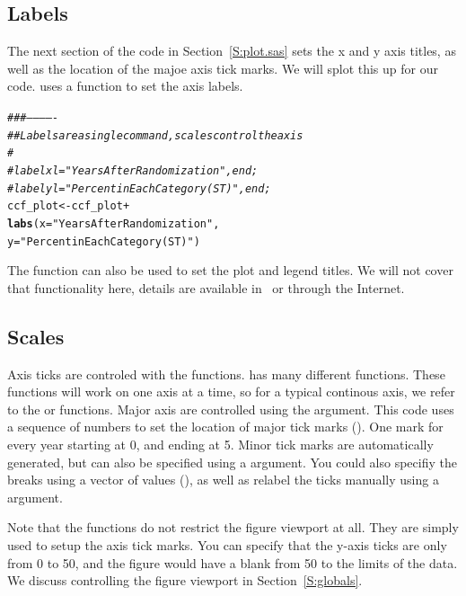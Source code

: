 \documentclass[nojss]{jss}\usepackage[]{graphicx}\usepackage[]{color}
\makeatletter
\newcommand{\hlstr}[1]{\textcolor[rgb]{0.192,0.494,0.8}{#1}}%
\newcommand{\hlcom}[1]{\textcolor[rgb]{0.678,0.584,0.686}{\textit{#1}}}%
\newcommand{\hlopt}[1]{\textcolor[rgb]{0,0,0}{#1}}%
\newcommand{\hlstd}[1]{\textcolor[rgb]{0.345,0.345,0.345}{#1}}%
\newcommand{\hlkwb}[1]{\textcolor[rgb]{0.69,0.353,0.396}{#1}}%
\newcommand{\hlkwc}[1]{\textcolor[rgb]{0.333,0.667,0.333}{#1}}%
\newcommand{\hlkwd}[1]{\textcolor[rgb]{0.737,0.353,0.396}{\textbf{#1}}}%
\newenvironment{kframe}{%
 \def\at@end@of@kframe{}%
 \ifinner\ifhmode%
  \def\at@end@of@kframe{\end{minipage}}%
  \begin{minipage}{\columnwidth}%
 \fi\fi%
 \def\FrameCommand##1{\hskip\@totalleftmargin \hskip-\fboxsep
 \colorbox{shadecolor}{##1}\hskip-\fboxsep
     \hskip-\linewidth \hskip-\@totalleftmargin \hskip\columnwidth}%
 \MakeFramed {\advance\hsize-\width
   \@totalleftmargin\z@ \linewidth\hsize
   \@setminipage}}%
 {\par\unskip\endMakeFramed%
 \at@end@of@kframe}
\newenvironment{knitrout}{}{} %
\makeatother
\begin{document}
\subsection{Labels}\label{S:labels}
The next section of the  code in Section~\ref{S:plot.sas} sets the x and y axis titles, as well as the location of the majoe axis tick marks. We will splot this up for our  code.   uses a  function to set the axis labels. 
\begin{knitrout}\footnotesize
{}\color{fgcolor}\begin{kframe}
\begin{alltt}
\hlcom{###-------------}
\hlcom{## Labels are a single command, scales control the axis}
\hlcom{#}
\hlcom{#    labelx l="Years After Randomization", end;}
\hlcom{#    labely l="Percent in Each Category (ST)", end;}
\hlstd{ccf_plot} \hlkwb{<-} \hlstd{ccf_plot} \hlopt{+}
  \hlkwd{labs}\hlstd{(}\hlkwc{x}\hlstd{=}\hlstr{"Years After Randomization"}\hlstd{,}
       \hlkwc{y}\hlstd{=}\hlstr{"Percent in Each Category (ST)"}\hlstd{)}
\end{alltt}
\end{kframe}
\end{knitrout}

The  function can also be used to set the plot  and legend titles. We will not cover that functionality here, details are available in~\cite{Wickham:2009} or through the Internet.

\subsection{Scales}\label{S:scales}
Axis ticks are controled with the  functions.  has many different  functions. These functions will work on one axis at a time, so for a typical continous axis, we refer to the  or  functions. Major axis are controlled using the  argument. This code uses a sequence of numbers to set the location of major tick marks (). One mark for every year starting at 0, and ending at 5. Minor tick marks are automatically generated, but can also be specified using a  argument. You could also specifiy the breaks using a vector of values (), as well as relabel the ticks manually using a  argument.

Note that the  functions do not restrict the figure viewport at all. They are simply used to setup the axis tick marks. You can specify that the y-axis ticks are only from 0 to 50, and the figure would have a blank from 50 to the limits of the data. We discuss controlling the figure viewport in Section~\ref{S:globals}.
\end{document}
